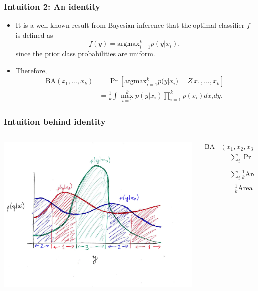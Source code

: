 \documentclass{beamer}
\begin{document}
\begin{frame}
\frametitle{Intuition 2: An identity}
\begin{itemize}
\item It is a well-known result from Bayesian inference that the optimal classifier $f$ is defined as
\[
f(y) = \text{argmax}_{i=1}^k p(y|x_i),
\]
since the prior class probabilities are uniform.
\item Therefore,
\begin{align*}
\text{BA}(x_1,...,x_k) &= \Pr[\text{argmax}_{i=1}^k p(y|x_i) = Z| x_1,...,x_k] 
\\&= \frac{1}{k}\int \max_{i=1}^k p(y|x_i) \prod_{i=1}^k p(x_i) dx_{i} dy.
\end{align*}
\end{itemize}
\end{frame}

\begin{frame}
\frametitle{Intuition behind identity}
\begin{columns}
\begin{column}{0.5\textwidth}
\begin{center}
\includegraphics[scale = 0.35, clip = true, trim = 1.2in 1.3in 0in 1in]{var_ba.png}
\end{center}   
\end{column}
\begin{column}{0.5\textwidth}  %
\begin{align*}
\text{BA}&(x_1,x_2,x_3) \\&= \sum_i \Pr[x_i]\Pr_{Y \sim p(y|x_i)}[Y \in \text{zone }i]
\\&= \sum_i \frac{1}{k} \text{Area under curve $i$ in zone $i$}
\\&\ \ \ = \frac{1}{k} \text{Area under } \max_{i=1}^k p(y|x_i)
\end{align*}
\end{column}
\end{columns}
\end{frame}
\end{document}
